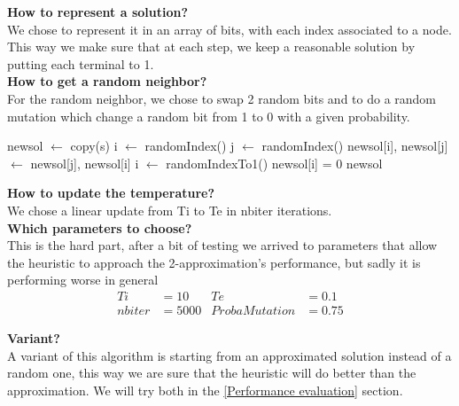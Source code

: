 \documentclass{article}
\begin{document}
\textbf{How to represent a solution?}\\

We chose to represent it in an array of bits, with each index associated to a node. 
This way we make sure that at each step, we keep a reasonable solution by putting each terminal to 1.\\

\textbf{How to get a random neighbor?}\\

For the random neighbor, we chose to swap 2 random bits and to do a random mutation which change a random bit from 1 to 0 with a given probability.

\begin{algorithm}
\begin{algorithmic}
        \State newsol $\gets$ copy(s)
        \State i $\gets$ randomIndex()
        \State j $\gets$ randomIndex()
        \State newsol[i], newsol[j] $\gets$ newsol[j], newsol[i]
            \State i $\gets$ randomIndexTo1()
            \State newsol[i] = 0
        \EndIf
        \Return newsol
    \EndFunction\\
\end{algorithmic}
\end{algorithm}

\textbf{How to update the temperature?}\\

We chose a linear update from Ti to Te in nbiter iterations.\\

\textbf{Which parameters to choose?}\\

This is the hard part, after a bit of testing we arrived to parameters that allow the heuristic to approach the 2-approximation's performance, but sadly it is performing worse in general
\begin{align*}
    Ti &= 10
    & Te &= 0.1\\
    nbiter &= 5000
    & ProbaMutation &= 0.75
\end{align*}

\textbf{Variant?}\\

A variant of this algorithm is starting from an approximated solution instead of a random one, this way we are sure that the heuristic will do better than the approximation. We will try both in the \ref{Performance evaluation} section.
\newpage
\end{document}
